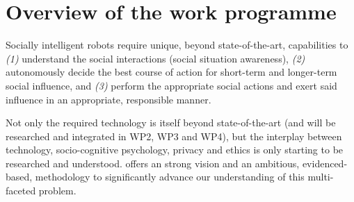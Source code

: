 \section{Overview of the \project work programme}

Socially intelligent robots require unique, beyond state-of-the-art,
capabilities to \emph{(1)} understand the social interactions (social
situation awareness), \emph{(2)} autonomously decide the best course of action for
short-term and longer-term social influence, and \emph{(3)} perform the
appropriate social actions and exert said influence in an appropriate,
responsible manner.

Not only the required technology is itself beyond state-of-the-art (and will be
researched and integrated in WP2, WP3 and WP4), but the
interplay between technology, socio-cognitive psychology, privacy and ethics is
only starting to be researched and understood. \project offers an
strong vision and an ambitious, evidenced-based, methodology to significantly
advance our understanding of this multi-faceted problem.


